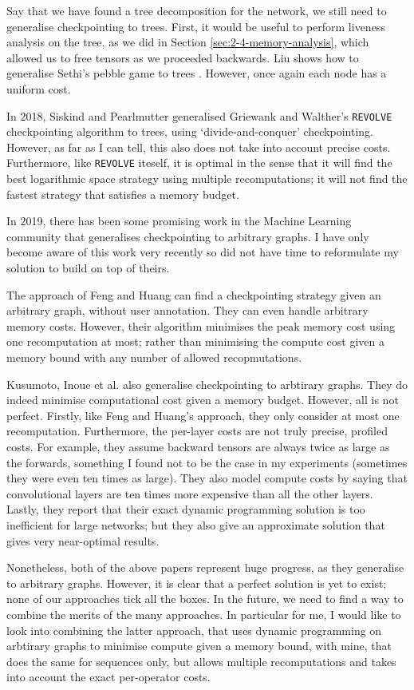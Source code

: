 Say that we have found a tree decomposition for the network, we still need to generalise checkpointing to trees.
First, it would be useful to perform liveness analysis on the tree, as we did in Section \ref{sec:2-4-memory-analysis}, which allowed us to free tensors as we proceeded backwards.
Liu shows how to generalise Sethi's pebble game to trees \cite{Liu1987}.
However, once again each node has a uniform cost.

In 2018, Siskind and Pearlmutter \cite{Siskind2018} generalised Griewank and Walther's \texttt{REVOLVE} checkpointing algorithm to trees, using `divide-and-conquer' checkpointing.
However, as far as I can tell, this also does not take into account precise costs.
Furthermore, like \texttt{REVOLVE} iteself, it is optimal in the sense that it will find the best logarithmic space strategy using multiple recomputations; it will not find the fastest strategy that satisfies a memory budget. 

In 2019, there has been some promising work in the Machine Learning community that generalises checkpointing to arbitrary graphs.
I have only become aware of this work very recently so did not have time to reformulate my solution to build on top of theirs.

The approach of Feng and Huang \cite{Feng2019} can find a checkpointing strategy given an arbitrary graph, without user annotation.
They can even handle arbitrary memory costs.
However, their algorithm minimises the peak memory cost using one recomputation at most; rather than minimising the compute cost given a memory bound with any number of allowed recopmutations.

Kusumoto, Inoue et al. \cite{Kusumoto2019} also generalise checkpointing to arbtirary graphs.
They do indeed minimise computational cost given a memory budget.
However, all is not perfect.
Firstly, like Feng and Huang's approach, they only consider at most one recomputation.
Furthermore, the per-layer costs are not truly precise, profiled costs.
For example, they assume backward tensors are always twice as large as the forwards, something I found not to be the case in my experiments (sometimes they were even ten times as large).
They also model compute costs by saying that convolutional layers are ten times more expensive than all the other layers.
Lastly, they report that their exact dynamic programming solution is too inefficient for large networks; but they also give an approximate solution that gives very near-optimal results.

Nonetheless, both of the above papers represent huge progress, as they generalise to arbitrary graphs.
However, it is clear that a perfect solution is yet to exist;
none of our approaches tick all the boxes.
In the future, we need to find a way to combine the merits of the many approaches.
In particular for me, I would like to look into combining the latter approach, that uses dynamic programming on arbtirary graphs to minimise compute given a memory bound, with mine, that does the same for sequences only, but allows multiple recomputations and takes into account the exact per-operator costs.
